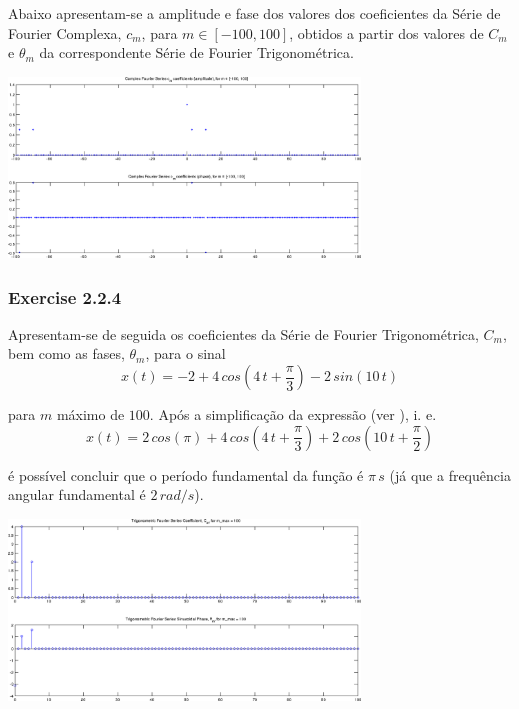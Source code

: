 \documentclass[a4paper]{article}
\begin{document}
\noindent Abaixo apresentam-se a amplitude e fase dos valores dos coeficientes da Série de Fourier Complexa, $c_m$, para $m \in [-100, 100]$, obtidos a partir dos valores de $C_m$ e $\theta_m$ da correspondente Série de Fourier Trigonométrica.
\begin{center}
	\includegraphics[width=0.70\textwidth]{images/ex2_2_3_complex_cm.png}
	\label{fig:ex2_2_3_complex_cm}
\end{center}

\subsubsection{Exercise 2.2.4}
\label{subsubsec:ex_2_2_4}
\noindent Apresentam-se de seguida os coeficientes da Série de Fourier Trigonométrica, $C_m$, bem como as fases, $\theta_m$, para o sinal
\[
	x(t) = -2 + 4 \, cos\left(4 \, t + \frac{\pi}{3}\right) - 2 \, sin(10 \, t)
\]

\noindent para $m$ máximo de $100$. Após a simplificação da expressão (ver \emph{}), i. e.
\[
	x(t) = 2 \, cos(\pi) + 4 \, cos\left(4 \, t + \frac{\pi}{3}\right) + 2 \, cos\left(10 \, t + \frac{\pi}{2}\right)
\]

\noindent é possível concluir que o período fundamental da função é $\pi \, s$ (já que a frequência angular fundamental é $2 \, rad/s$).

\begin{center}
	\includegraphics[width=0.70\textwidth]{images/ex2_2_4_cm_tm.png}
	\label{fig:ex2_2_4_cm_tm}
\end{center}
\end{document}
